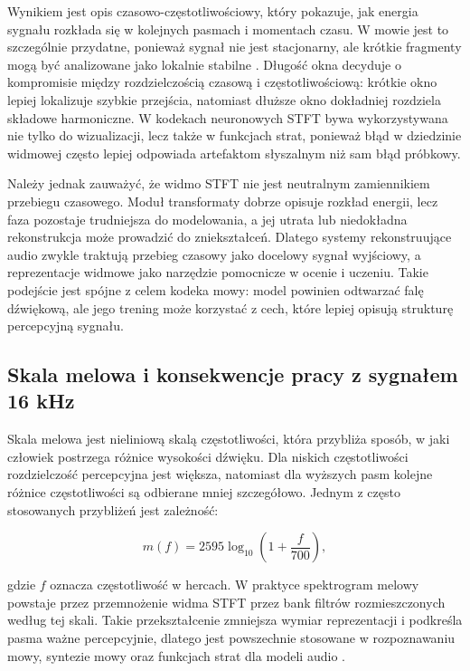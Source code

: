 Wynikiem jest opis czasowo-częstotliwościowy, który pokazuje, jak energia sygnału rozkłada się w kolejnych pasmach i momentach czasu. W mowie jest to szczególnie przydatne, ponieważ sygnał nie jest stacjonarny, ale krótkie fragmenty mogą być analizowane jako lokalnie stabilne \cite{RabinerSchafer2011SpeechDSP}. Długość okna decyduje o kompromisie między rozdzielczością czasową i częstotliwościową: krótkie okno lepiej lokalizuje szybkie przejścia, natomiast dłuższe okno dokładniej rozdziela składowe harmoniczne. W kodekach neuronowych STFT bywa wykorzystywana nie tylko do wizualizacji, lecz także w funkcjach strat, ponieważ błąd w dziedzinie widmowej często lepiej odpowiada artefaktom słyszalnym niż sam błąd próbkowy.

Należy jednak zauważyć, że widmo STFT nie jest neutralnym zamiennikiem przebiegu czasowego. Moduł transformaty dobrze opisuje rozkład energii, lecz faza pozostaje trudniejsza do modelowania, a jej utrata lub niedokładna rekonstrukcja może prowadzić do zniekształceń. Dlatego systemy rekonstruujące audio zwykle traktują przebieg czasowy jako docelowy sygnał wyjściowy, a reprezentacje widmowe jako narzędzie pomocnicze w ocenie i uczeniu. Takie podejście jest spójne z celem kodeka mowy: model powinien odtwarzać falę dźwiękową, ale jego trening może korzystać z cech, które lepiej opisują strukturę percepcyjną sygnału.

\subsection{Skala melowa i konsekwencje pracy z sygnałem 16 kHz}
\label{subsec:skala-melowa-16khz}

Skala melowa jest nieliniową skalą częstotliwości, która przybliża sposób, w jaki człowiek postrzega różnice wysokości dźwięku. Dla niskich częstotliwości rozdzielczość percepcyjna jest większa, natomiast dla wyższych pasm kolejne różnice częstotliwości są odbierane mniej szczegółowo. Jednym z często stosowanych przybliżeń jest zależność:

\begin{equation}
    m(f) = 2595 \log_{10}\left(1 + \frac{f}{700}\right),
\end{equation}

gdzie \(f\) oznacza częstotliwość w hercach. W praktyce spektrogram melowy powstaje przez przemnożenie widma STFT przez bank filtrów rozmieszczonych według tej skali. Takie przekształcenie zmniejsza wymiar reprezentacji i podkreśla pasma ważne percepcyjnie, dlatego jest powszechnie stosowane w rozpoznawaniu mowy, syntezie mowy oraz funkcjach strat dla modeli audio \cite{RabinerSchafer2011SpeechDSP,ZwickerFastl1999Psychoacoustics}.

